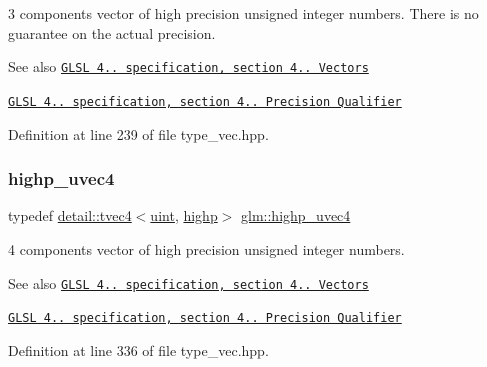 3 components vector of high precision unsigned integer numbers. There is no guarantee on the actual precision.

\begin{DoxySeeAlso}{See also}
\href{http://www.opengl.org/registry/doc/GLSLangSpec.4.20.8.pdf}{\tt G\+L\+SL 4.. specification, section 4.. Vectors} 

\href{http://www.opengl.org/registry/doc/GLSLangSpec.4.20.8.pdf}{\tt G\+L\+SL 4.. specification, section 4.. Precision Qualifier} 
\end{DoxySeeAlso}


Definition at line 239 of file type\+\_\+vec.\+hpp.

\mbox{\label{group__core__precision_ga7cb8cc501f7e680e1889b93eb80e6c46}} 
\subsubsection{\texorpdfstring{highp\+\_\+uvec4}{highp\_uvec4}}
{\footnotesize\ttfamily typedef \hyperlink{structglm_1_1detail_1_1tvec4}{detail\+::tvec4}$<$\hyperlink{group__core__precision_ga4fd29415871152bfb5abd588334147c8}{uint}, \hyperlink{namespaceglm_a0f04f086094c747d227af4425893f545ac6f7eab42eacbb10d59a58e95e362074}{highp}$>$ \hyperlink{group__core__precision_ga7cb8cc501f7e680e1889b93eb80e6c46}{glm\+::highp\+\_\+uvec4}}

4 components vector of high precision unsigned integer numbers.

\begin{DoxySeeAlso}{See also}
\href{http://www.opengl.org/registry/doc/GLSLangSpec.4.20.8.pdf}{\tt G\+L\+SL 4.. specification, section 4.. Vectors} 

\href{http://www.opengl.org/registry/doc/GLSLangSpec.4.20.8.pdf}{\tt G\+L\+SL 4.. specification, section 4.. Precision Qualifier} 
\end{DoxySeeAlso}


Definition at line 336 of file type\+\_\+vec.\+hpp.

\mbox{\label{group__core__precision_ga37645abcfcc1278567e99f1ca492bfbb}} 
